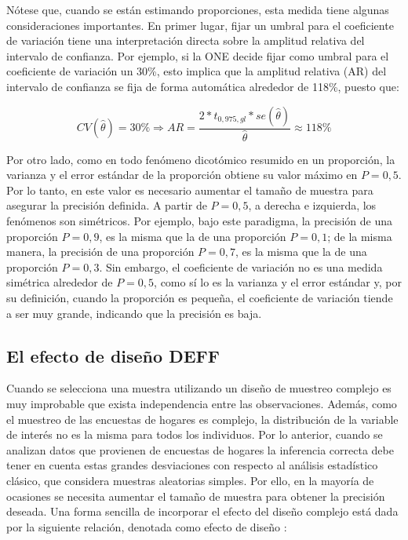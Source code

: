 \documentclass[12pt,spanish,]{book}
\begin{document}
Nótese que, cuando se están estimando proporciones, esta medida tiene algunas consideraciones importantes. En primer lugar, fijar un umbral para el coeficiente de variación tiene una interpretación directa sobre la amplitud relativa del intervalo de confianza. Por ejemplo, si la ONE decide fijar como umbral para el coeficiente de variación un 30\%, esto implica que la amplitud relativa (AR) del intervalo de confianza se fija de forma automática alrededor de 118\%, puesto que:

\[
CV(\hat\theta) = 30\% 
\Rightarrow 
AR = \frac{2*t_{0,975, gl} * se(\hat\theta)}{\hat\theta} \approx 118\%
\]

Por otro lado, como en todo fenómeno dicotómico resumido en un proporción, la varianza y el error estándar de la proporción obtiene su valor máximo en \(P=0,5\). Por lo tanto, en este valor es necesario aumentar el tamaño de muestra para asegurar la precisión definida. A partir de \(P=0,5\), a derecha e izquierda, los fenómenos son simétricos. Por ejemplo, bajo este paradigma, la precisión de una proporción \(P=0,9\), es la misma que la de una proporción \(P=0,1\); de la misma manera, la precisión de una proporción \(P=0,7\), es la misma que la de una proporción \(P=0,3\). Sin embargo, el coeficiente de variación no es una medida simétrica alrededor de \(P=0,5\), como sí lo es la varianza y el error estándar y, por su definición, cuando la proporción es pequeña, el coeficiente de variación tiende a ser muy grande, indicando que la precisión es baja.

\hypertarget{el-efecto-de-diseno-deff}{%
\subsection{El efecto de diseño DEFF}\label{el-efecto-de-diseno-deff}}

Cuando se selecciona una muestra utilizando un diseño de muestreo complejo es muy improbable que exista independencia entre las observaciones. Además, como el muestreo de las encuestas de hogares es complejo, la distribución de la variable de interés no es la misma para todos los individuos. Por lo anterior, cuando se analizan datos que provienen de encuestas de hogares la inferencia correcta debe tener en cuenta estas grandes desviaciones con respecto al análisis estadístico clásico, que considera muestras aleatorias simples. Por ello, en la mayoría de ocasiones se necesita aumentar el tamaño de muestra para obtener la precisión deseada. Una forma sencilla de incorporar el efecto del diseño complejo está dada por la siguiente relación, denotada como efecto de diseño \autocite{Kish_1965}:
\end{document}
